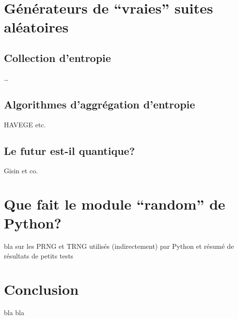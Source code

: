 \documentclass{scrartcl}
\begin{document}
\section{Générateurs de ``vraies'' suites aléatoires}
\subsection{Collection d'entropie}
\ldots
\subsection{Algorithmes d'aggrégation d'entropie}
HAVEGE etc.
\subsection{Le futur est-il quantique?}
Gisin et co.

\section{Que fait le module ``random'' de Python?}
bla sur les PRNG et TRNG utilisés (indirectement) par Python et résumé de
résultats de petits tests

\section{Conclusion}
bla bla
\end{document}
